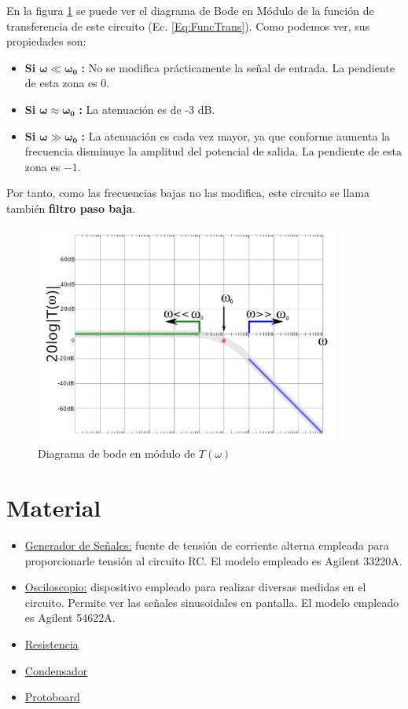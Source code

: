 En la figura \ref{Img:FuncTrans} se puede ver el diagrama de Bode en Módulo de la función de transferencia de este circuito (Ec. \ref{Eq:FuncTrans}). Como podemos ver, sus propiedades son:
\begin{itemize}
    \item \textbf{Si} $\mathbf{\omega \ll \omega_0}$ \textbf{:} No se modifica prácticamente la señal de entrada. La pendiente de esta zona es $0$.
    \item \textbf{Si} $\mathbf{\omega \approx \omega_0}$ \textbf{:} La atenuación es de -3 dB.
    \item \textbf{Si} $\mathbf{\omega \gg \omega_0}$ \textbf{:} La atenuación es cada vez mayor, ya que conforme aumenta la frecuencia disminuye la amplitud del potencial de salida. La pendiente de esta zona es $-1$.
\end{itemize}
Por tanto, como las frecuencias bajas no las modifica, este circuito se llama también \textbf{filtro paso baja}.

\begin{figure}
    \centering
    \includegraphics[width=10cm]{Imágenes 03/Funcion_De_Transferencia.jpg}
    \caption{Diagrama de bode en módulo de $T(\omega)$}
    \label{Img:FuncTrans}
\end{figure}

\section{Material}
\begin{itemize}
    \item \underline{Generador de Señales:} fuente de tensión de corriente alterna empleada para proporcionarle tensión al circuito RC. El modelo empleado es Agilent 33220A.
    \item \underline{Osciloscopio:} dispositivo empleado para realizar diversas medidas en el circuito. Permite ver las señales sinusoidales en pantalla. El modelo empleado es Agilent 54622A.
    \item \underline{Resistencia}
    \item \underline{Condensador}
    \item \underline{Protoboard}
\end{itemize}



